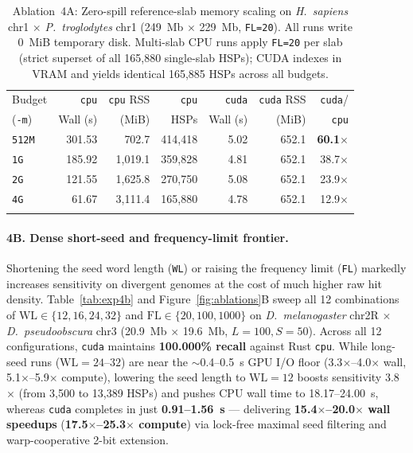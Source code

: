 \documentclass[pdflatex,sn-vancouver,Numbered]{sn-jnl}
\newcommand{\eFourACpuFiveTwelveW}{301.53} \newcommand{\eFourACpuFiveTwelveR}{702.7}   \newcommand{\eFourACpuFiveTwelveF}{414,418} \newcommand{\eFourASpFiveTwelve}{60.1$\times$}
\newcommand{\eFourACpuOneGW}{185.92}       \newcommand{\eFourACpuOneGR}{1,019.1}       \newcommand{\eFourACpuOneGF}{359,828}       \newcommand{\eFourASpOneG}{38.7$\times$}
\newcommand{\eFourACpuTwoGW}{121.55}       \newcommand{\eFourACpuTwoGR}{1,625.8}       \newcommand{\eFourACpuTwoGF}{270,750}       \newcommand{\eFourASpTwoG}{23.9$\times$}
\newcommand{\eFourACpuFourGW}{61.67}       \newcommand{\eFourACpuFourGR}{3,111.4}      \newcommand{\eFourACpuFourGF}{165,880}      \newcommand{\eFourASpFourG}{12.9$\times$}
\newcommand{\eFourACudaFiveTwelveW}{5.02}  \newcommand{\eFourACudaFiveTwelveR}{652.1}
\newcommand{\eFourACudaOneGW}{4.81}        \newcommand{\eFourACudaOneGR}{652.1}
\newcommand{\eFourACudaTwoGW}{5.08}        \newcommand{\eFourACudaTwoGR}{652.1}
\newcommand{\eFourACudaFourGW}{4.78}       \newcommand{\eFourACudaFourGR}{652.1}
\begin{document}
\begin{table}[ht]
\centering
\scriptsize
\setlength{\tabcolsep}{2pt}
\caption{Ablation~4A: Zero-spill reference-slab memory scaling on \textit{H.~sapiens} chr1 $\times$ \textit{P.~troglodytes} chr1 (249~Mb $\times$ 229~Mb, \texttt{FL=20}). All runs write 0~MiB temporary disk. Multi-slab CPU runs apply \texttt{FL=20} per slab (strict superset of all 165,880 single-slab HSPs); CUDA indexes in VRAM and yields identical 165,885 HSPs across all budgets.}\label{tab:exp4a}
\begin{tabular*}{\textwidth}{@{\extracolsep\fill}lrrrrrr}
\toprule
Budget & \texttt{cpu} & \texttt{cpu} RSS & \texttt{cpu} & \texttt{cuda} & \texttt{cuda} RSS & \texttt{cuda}/ \\
(\texttt{-m}) & Wall (s) & (MiB) & HSPs & Wall (s) & (MiB) & \texttt{cpu} \\
\midrule
\texttt{512M} & \eFourACpuFiveTwelveW & \eFourACpuFiveTwelveR & \eFourACpuFiveTwelveF & \eFourACudaFiveTwelveW & \eFourACudaFiveTwelveR & \textbf{\eFourASpFiveTwelve} \\
\texttt{1G}   & \eFourACpuOneGW       & \eFourACpuOneGR       & \eFourACpuOneGF       & \eFourACudaOneGW       & \eFourACudaOneGR       & \eFourASpOneG \\
\texttt{2G}   & \eFourACpuTwoGW       & \eFourACpuTwoGR       & \eFourACpuTwoGF       & \eFourACudaTwoGW       & \eFourACudaTwoGR       & \eFourASpTwoG \\
\texttt{4G}   & \eFourACpuFourGW      & \eFourACpuFourGR      & \eFourACpuFourGF      & \eFourACudaFourGW      & \eFourACudaFourGR      & \eFourASpFourG \\
\botrule
\end{tabular*}
\end{table}

\paragraph{4B. Dense short-seed and frequency-limit frontier.}
Shortening the seed word length (\texttt{WL}) or raising the frequency limit (\texttt{FL}) markedly increases sensitivity on divergent genomes at the cost of much higher raw hit density. Table~\ref{tab:exp4b} and Figure~\ref{fig:ablations}B sweep all 12 combinations of $\text{WL} \in \{12, 16, 24, 32\}$ and $\text{FL} \in \{20, 100, 1000\}$ on \textit{D.~melanogaster} chr2R $\times$ \textit{D.~pseudoobscura} chr3 (20.9~Mb $\times$ 19.6~Mb, $L=100, S=50$). Across all 12 configurations, \texttt{cuda} maintains \textbf{100.000\% recall} against Rust \texttt{cpu}. While long-seed runs ($\text{WL}=24$--$32$) are near the $\sim$0.4--0.5~s GPU I/O floor (3.3$\times$--4.0$\times$ wall, 5.1$\times$--5.9$\times$ compute), lowering the seed length to $\text{WL}=12$ boosts sensitivity 3.8$\times$ (from 3,500 to 13,389 HSPs) and pushes CPU wall time to 18.17--24.00~s, whereas \texttt{cuda} completes in just \textbf{0.91--1.56~s} --- delivering \textbf{15.4$\times$--20.0$\times$ wall speedups} (\textbf{17.5$\times$--25.3$\times$ compute}) via lock-free maximal seed filtering and warp-cooperative 2-bit extension.
\end{document}
